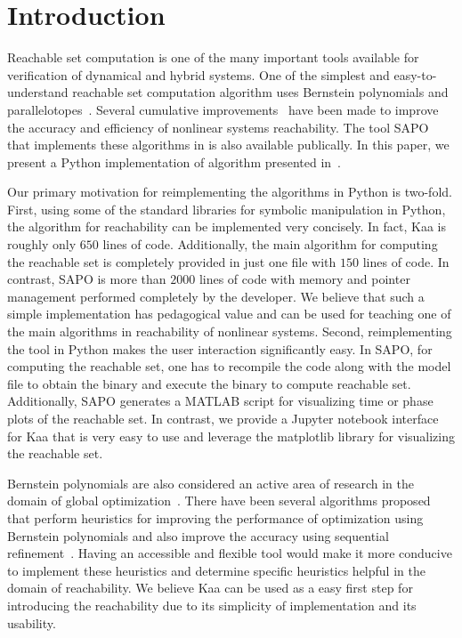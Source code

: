 \documentclass[EPiC]{easychair}
\begin{document}
%
%
%
\section{Introduction}

Reachable set computation is one of the many important tools available for verification of dynamical and hybrid systems.
%
One of the simplest and easy-to-understand reachable set computation algorithm uses Bernstein polynomials and parallelotopes~\cite{dang2009image}.
%
Several cumulative improvements~\cite{dang2012reachability,sassi2012reachability,dang2014parameter,dreossi2016parallelotope,dreossi2017reachability} have been made to improve the accuracy and efficiency of nonlinear systems reachability.
%
The tool SAPO~\cite{dreossi2017sapo} that implements these algorithms in \cplusplus is also available publically.
%
In this paper, we present a Python implementation of algorithm presented in~\cite{dreossi2017reachability}.


%
Our primary motivation for reimplementing the algorithms in Python is two-fold.
%
First, using some of the standard libraries for symbolic manipulation in Python, the algorithm for reachability can be implemented very concisely.
%
In fact, Kaa is roughly only $650$ lines of code.
%
Additionally, the main algorithm for computing the reachable set is completely provided in just one file with $150$ lines of code.
%
In contrast, SAPO is more than $2000$ lines of \cplusplus code with memory and pointer management performed completely by the developer.
%
We believe that such a simple implementation has pedagogical value and can be used for teaching one of the main algorithms in reachability of nonlinear systems.
%
Second, reimplementing the tool in Python makes the user interaction significantly easy. 
%
In SAPO, for computing the reachable set, one has to recompile the code along with the model file to obtain the binary and execute the binary to compute reachable set.
%
Additionally, SAPO generates a MATLAB script for visualizing time or phase plots of the reachable set.
%
In contrast, we provide a Jupyter notebook interface for Kaa that is very easy to use and leverage the matplotlib library for visualizing the reachable set.
%
%

Bernstein polynomials are also considered an active area of research in the domain of global optimization~\cite{nataray2002algorithm,garloff2003bernstein,nataraj2007new}.
%
There have been several algorithms proposed that perform heuristics for improving the performance of optimization using Bernstein polynomials and also improve the accuracy using sequential refinement~\cite{smith2009fast,munoz2013formalization}.
%
Having an accessible and flexible tool would make it more conducive to implement these heuristics and determine specific heuristics helpful in the domain of reachability.
%
We believe Kaa can be used as a easy first step for introducing the reachability due to its simplicity of implementation and its usability.
\end{document}
